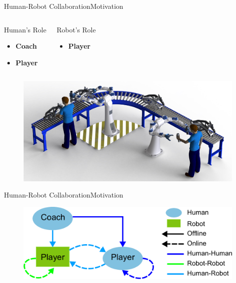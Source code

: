 \begin{frame}{Human-Robot Collaboration}{Motivation}

\begin{columns}
\begin{block}{ Human's Role }
\begin{minipage}[t][1.2cm][t]{.9\textwidth}
\centering
\begin{itemize}
\item {\bf Coach}
\item {\bf Player}
\end{itemize}
\end{minipage}
\end{block}	
\begin{block}{ Robot's Role }
\begin{minipage}[t][1.2cm][t]{.9\textwidth}
\centering
\begin{itemize}
\item {\bf Player}
\end{itemize}
\end{minipage}
\end{block}	
\end{columns}

\begin{figure}
	\centering
	\includegraphics[width=.7\linewidth]{figure/human_robot_collaboration}
\end{figure}

\end{frame}

\begin{frame}{Human-Robot Collaboration}{Motivation}

\begin{figure}
	\centering
	\includegraphics[width=.7\linewidth]{figure/team_info_flow}
\end{figure}

\end{frame}

